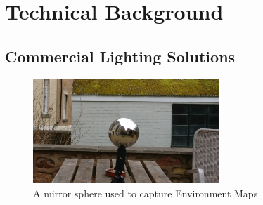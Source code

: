 \documentclass[ %
                    author={Gavin Parker},
                supervisor={Dr. Neill Campbell},
                    degree={MEng},
                     title={Deep Learning for Illumination Estimation from Stereo Images},
                  subtitle={},
                      type={Research},
                      year={2018} ]{dissertation}
\begin{document}
\chapter{Technical Background}
\label{chap:technical}
\section{Commercial Lighting Solutions}
\begin{figure}[H] 
\centering 
\includegraphics[width=7cm]{images/envmap} 
\caption{A mirror sphere used to capture Environment Maps} 
\label{fig:mirror_ball}
\end{figure} 
\end{document}

